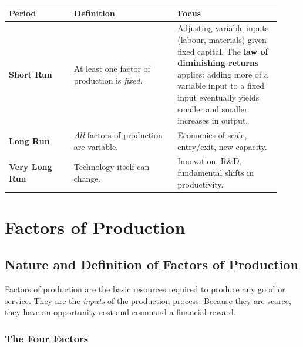 \documentclass[11pt, a4paper, twoside]{book}
\begin{document}
\begin{tcolorbox}[
  enhanced, colback=LightBlue, colframe=NavyPrimary,
  arc=0pt, boxrule=0.7pt,
  left=8pt, right=8pt, top=6pt, bottom=6pt
]
\begin{tabular}{@{}>{\RaggedRight\arraybackslash}p{0.22\linewidth}>{\RaggedRight\arraybackslash}p{0.35\linewidth}>{\RaggedRight\arraybackslash}p{0.35\linewidth}@{}}
\textbf{\color{NavyPrimary}Period} & \textbf{\color{NavyPrimary}Definition} & \textbf{\color{NavyPrimary}Focus} \\
\midrule
\textbf{Short Run} & At least one factor of production is \emph{fixed}. & Adjusting variable inputs (labour, materials) given fixed capital. The \textbf{law of diminishing returns} applies: adding more of a variable input to a fixed input eventually yields smaller and smaller increases in output. \\
\textbf{Long Run} & \emph{All} factors of production are variable. & Economies of scale, entry/exit, new capacity. \\
\textbf{Very Long Run} & Technology itself can change. & Innovation, R\&D, fundamental shifts in productivity. \\
\end{tabular}
\end{tcolorbox}

\section{Factors of Production}



\subsection{Nature and Definition of Factors of Production}

\begin{coreidea}
Factors of production are the basic resources required to produce any good or service. They are the \emph{inputs} of the production process. Because they are scarce, they have an opportunity cost and command a financial reward.
\end{coreidea}

\subsubsection{The Four Factors}
\end{document}
